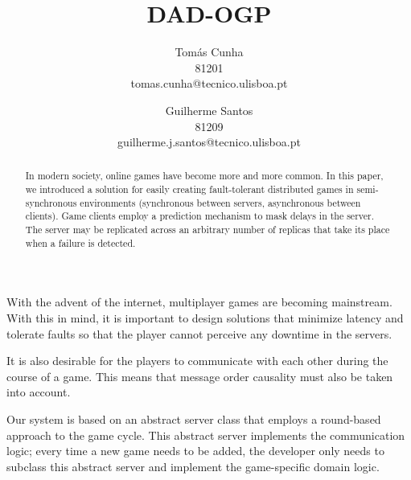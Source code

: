 \documentclass[times, 10pt,twocolumn]{article}
\begin{document}
\title{DAD-OGP}

\author{Tomás Cunha\\
81201\\ tomas.cunha@tecnico.ulisboa.pt\\
\and
Guilherme Santos\\
81209\\
guilherme.j.santos@tecnico.ulisboa.pt\\
}

\maketitle
\thispagestyle{empty}

\begin{abstract}
   In modern society, online games have become more and more
   common. In this paper, we introduced a solution for easily
   creating fault-tolerant distributed games in semi-synchronous
   environments (synchronous between servers, asynchronous
   between clients).
   Game clients employ a prediction mechanism to mask delays
   in the server.
   The server may be replicated across an arbitrary number of
   replicas that take its place when a failure is detected.
\end{abstract}




With the advent of the internet, multiplayer games
are becoming mainstream. With this in mind, it is important
to design solutions that minimize latency and tolerate faults
so that the player cannot perceive any downtime in the servers.

It is also desirable for the players to communicate with each other
during the course of a game. This means that message order causality must
also be taken into account.


Our system is based on an abstract server class that employs a round-based
approach to the game cycle. This abstract server implements the communication
logic; every time a new game needs to be added, the developer only needs to
subclass this abstract server and implement the game-specific domain logic.
\end{document}
